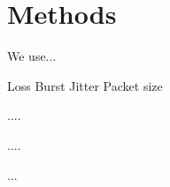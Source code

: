 \section{Methods} 
\label{sec:methods}


We use... 

Loss Burst 
Jitter 
Packet size 

....

....

...


